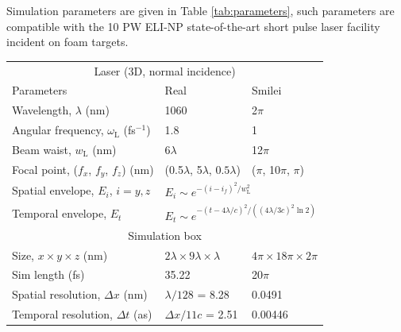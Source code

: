 Simulation parameters are given in Table \ref{tab:parameters}, such parameters are compatible with the 10 PW ELI-NP state-of-the-art short pulse laser facility \cite{tanakaCurrentStatusHighlights2020} incident on foam targets.
\begin{table}[]
	\begin{center}
	\begin{tabular}{lll}
		\hline \hline
		\multicolumn{3}{c}{Laser (3D, normal incidence)}   \\
		Parameters                                        & Real                                 & Smilei                         \\ \hline
		Wavelength, $\lambda$ (nm)                        & 1060                                 & 2$\pi$                      \\
		Angular frequency, $\omega_\mathrm{L}$ (fs$^{-1}$)         & 1.8                                  & 1                           \\
		Beam waist, $w_\mathrm{L}$ (nm)                            & 6$\lambda$                           & 12$\pi$                     \\
		Focal point, ($f_x$, $f_y$, $f_z$) (nm)                  & (0.5$\lambda$, 5$\lambda$, $0.5\lambda$)             & ($\pi$, 10$\pi$, $\pi$)           \vspace{0.25cm}\\ 
		Spatial envelope, $E_i$, $i = y,z$                           & \multicolumn{2}{l}{$E_i \sim e^{-(i-i_f)^2/w_\mathrm{L}^2}$}                \\
		Temporal envelope, $E_t$                          & \multicolumn{2}{l}{$E_t \sim e^{-(t-4\lambda/c)^2/((4\lambda/3c)^2\ln 2)}$} \vspace{0.15cm}\\ \hline \hline
		\multicolumn{3}{c}{Simulation box}   \\ \hline
		Size, $x \times y\times z$ (nm)                           & $2\lambda \times 9\lambda \times \lambda$          & $4\pi \times 18\pi \times 2\pi$         \\
		Sim length (fs)                                   & 35.22                                & 20$\pi$                     \\
		Spatial resolution, $\Delta x$ (nm)               & $\lambda/128$ = 8.28                 & 0.0491                      \\
		Temporal resolution, $\Delta t$ (as)              & $\Delta x/11c$ = 2.51               & 0.00446                   \vspace{0.15cm}  \\ \hline \hline

\end{tabular}
\end{center}
\end{table}
